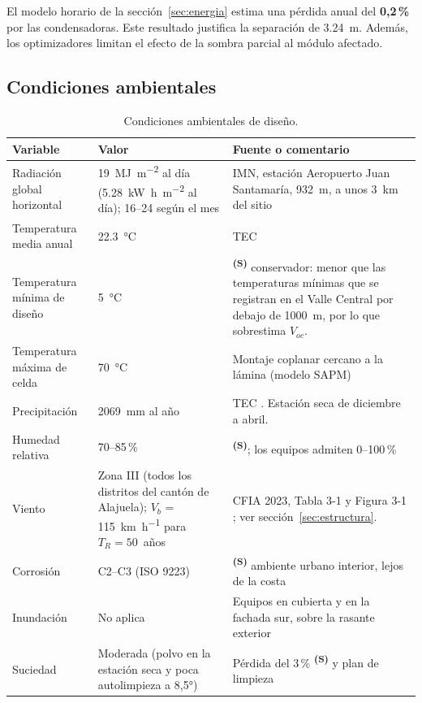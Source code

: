 \documentclass[12pt]{article}
\newcommand{\supuesto}{\textsuperscript{\textcolor{orange!80!black}{\textbf{(S)}}}}
\begin{document}
El modelo horario de la sección~\ref{sec:energia} estima una pérdida anual del \textbf{0,2\,\%} por las condensadoras. Este resultado justifica la separación de \SI{3.24}{\meter}. Además, los optimizadores limitan el efecto de la sombra parcial al módulo afectado.

\subsection{Condiciones ambientales}
\begin{table}[H]
\centering\small
\caption{Condiciones ambientales de diseño.}\label{tab:clima}
\begin{tabularx}{\textwidth}{L{3.6cm}L{4.6cm}Y}
\toprule
\textbf{Variable} & \textbf{Valor} & \textbf{Fuente o comentario}\\
\midrule
Radiación global horizontal & \SI{19}{\mega\joule\per\meter\squared} al día (\SI{5.28}{\kilo\watt\hour\per\meter\squared} al día); 16--24 según el mes & IMN, estación Aeropuerto Juan Santamaría, 932~m, a unos 3~km del sitio \cite{imnRad}\\
Temperatura media anual & \SI{22.3}{\celsius} & TEC \cite{tecSitio}\\
Temperatura mínima de diseño & \SI{5}{\celsius} & \supuesto{} conservador: menor que las temperaturas mínimas que se registran en el Valle Central por debajo de 1000~m, por lo que sobrestima $V_{oc}$.\\
Temperatura máxima de celda & \SI{70}{\celsius} & Montaje coplanar cercano a la lámina (modelo SAPM)\\
Precipitación & \SI{2069}{\milli\meter} al año & TEC \cite{tecSitio}. Estación seca de diciembre a abril.\\
Humedad relativa & 70--85\,\% & \supuesto{}; los equipos admiten 0--100\,\%\\
Viento & Zona III (todos los distritos del cantón de Alajuela); $V_b$ = \SI{115}{\kilo\meter\per\hour} para $T_R=50$~años & CFIA 2023, Tabla 3-1 y Figura 3-1 \cite{cfiaViento}; ver sección~\ref{sec:estructura}.\\
Corrosión & C2--C3 (ISO 9223) & \supuesto{} ambiente urbano interior, lejos de la costa\\
Inundación & No aplica & Equipos en cubierta y en la fachada sur, sobre la rasante exterior\\
Suciedad & Moderada (polvo en la estación seca y poca autolimpieza a 8,5°) & Pérdida del 3\,\% \supuesto{} y plan de limpieza\\
\bottomrule
\end{tabularx}
\end{table}
\end{document}
